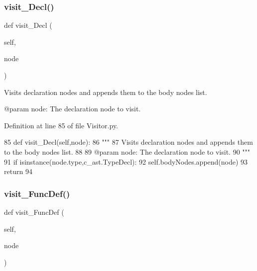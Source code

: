 \subsubsection{\texorpdfstring{visit\+\_\+\+Decl()}{visit\_Decl()}}
{\footnotesize\ttfamily def visit\+\_\+\+Decl (\begin{DoxyParamCaption}\item[{}]{self,  }\item[{}]{node }\end{DoxyParamCaption})}

\begin{DoxyVerb}Visits declaration nodes and appends them to the body nodes list.

@param node: The declaration node to visit.
\end{DoxyVerb}
 

Definition at line 85 of file Visitor.\+py.


\begin{DoxyCode}
85     \textcolor{keyword}{def }visit\_Decl(self,node):
86         \textcolor{stringliteral}{"""
}
87 \textcolor{stringliteral}{        Visits declaration nodes and appends them to the body nodes list.
}
88 \textcolor{stringliteral}{
}
89 \textcolor{stringliteral}{        @param node: The declaration node to visit.
}
90 \textcolor{stringliteral}{        """}
91         \textcolor{keywordflow}{if} isinstance(node.type,c\_ast.TypeDecl):
92             self.bodyNodes.append(node)
93         \textcolor{keywordflow}{return}
94         
\end{DoxyCode}
\mbox{\label{classPostProcessor_1_1Visitor_1_1NegationVisitor_a49d407ef465dd0eba624f0f54fb18041}} 
\subsubsection{\texorpdfstring{visit\+\_\+\+Func\+Def()}{visit\_FuncDef()}}
{\footnotesize\ttfamily def visit\+\_\+\+Func\+Def (\begin{DoxyParamCaption}\item[{}]{self,  }\item[{}]{node }\end{DoxyParamCaption})}

